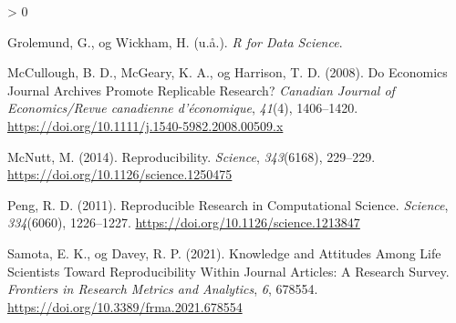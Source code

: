 \documentclass[
  12pt,
  norsk,
]{article}
\newlength{\cslhangindent}
\newenvironment{CSLReferences}[2] %
 {%
  \setlength{\parindent}{0pt}
  \ifodd #1 \everypar{\setlength{\hangindent}{\cslhangindent}}\ignorespaces\fi
  \ifnum #2 > 0
  \setlength{\parskip}{#2\baselineskip}
  \fi
 }%
 {}
\begin{document}
\hypertarget{refs}{}
\begin{CSLReferences}{1}{0}
\leavevmode\hypertarget{ref-grolemund}{}%
Grolemund, G., og Wickham, H. (u.å.). \emph{R for {Data Science}}.

\leavevmode\hypertarget{ref-mccullough2008}{}%
McCullough, B. D., McGeary, K. A., og Harrison, T. D. (2008). Do
Economics Journal Archives Promote Replicable Research? \emph{Canadian
Journal of Economics/Revue canadienne d'économique}, \emph{41}(4),
1406--1420. \url{https://doi.org/10.1111/j.1540-5982.2008.00509.x}

\leavevmode\hypertarget{ref-mcnutt2014}{}%
McNutt, M. (2014). Reproducibility. \emph{Science}, \emph{343}(6168),
229--229. \url{https://doi.org/10.1126/science.1250475}

\leavevmode\hypertarget{ref-peng2011}{}%
Peng, R. D. (2011). Reproducible {Research} in {Computational Science}.
\emph{Science}, \emph{334}(6060), 1226--1227.
\url{https://doi.org/10.1126/science.1213847}

\leavevmode\hypertarget{ref-samota2021}{}%
Samota, E. K., og Davey, R. P. (2021). Knowledge and Attitudes Among
Life Scientists Toward Reproducibility Within Journal Articles: A
Research Survey. \emph{Frontiers in Research Metrics and Analytics},
\emph{6}, 678554. \url{https://doi.org/10.3389/frma.2021.678554}

\end{CSLReferences}
\end{document}
